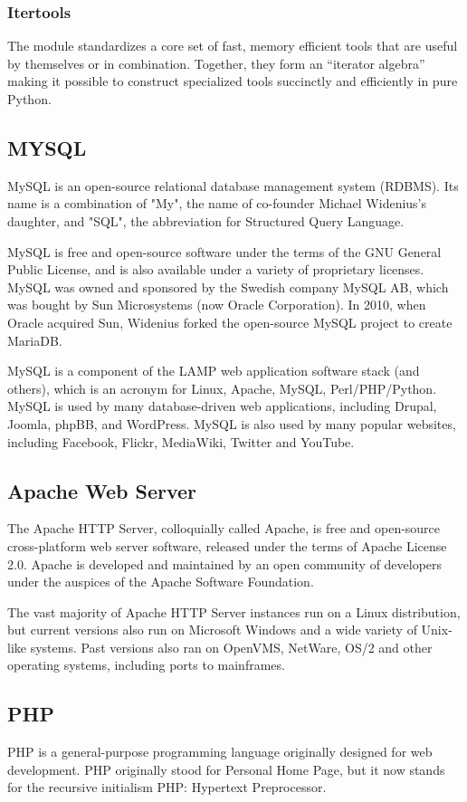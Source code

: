 \documentclass[12pt]{article}
\begin{document}
\subsubsection{Itertools}
The module standardizes a core set of fast, memory efficient tools that are useful by themselves or in combination. Together, they form an “iterator algebra” making it possible to construct specialized tools succinctly and efficiently in pure Python.

\subsection{MYSQL}
MySQL is an open-source relational database management system (RDBMS). Its name is a combination of "My", the name of co-founder Michael Widenius's daughter, and "SQL", the abbreviation for Structured Query Language.

MySQL is free and open-source software under the terms of the GNU General Public License, and is also available under a variety of proprietary licenses. MySQL was owned and sponsored by the Swedish company MySQL AB, which was bought by Sun Microsystems (now Oracle Corporation). In 2010, when Oracle acquired Sun, Widenius forked the open-source MySQL project to create MariaDB.

MySQL is a component of the LAMP web application software stack (and others), which is an acronym for Linux, Apache, MySQL, Perl/PHP/Python. MySQL is used by many database-driven web applications, including Drupal, Joomla, phpBB, and WordPress. MySQL is also used by many popular websites, including Facebook, Flickr, MediaWiki, Twitter and YouTube.

\subsection{Apache Web Server}
The Apache HTTP Server, colloquially called Apache, is free and open-source cross-platform web server software, released under the terms of Apache License 2.0. Apache is developed and maintained by an open community of developers under the auspices of the Apache Software Foundation.

The vast majority of Apache HTTP Server instances run on a Linux distribution, but current versions also run on Microsoft Windows and a wide variety of Unix-like systems. Past versions also ran on OpenVMS, NetWare, OS/2 and other operating systems, including ports to mainframes.

\subsection{PHP}
PHP is a general-purpose programming language originally designed for web development. PHP originally stood for Personal Home Page,
but it now stands for the recursive initialism PHP: Hypertext Preprocessor.
\end{document}
